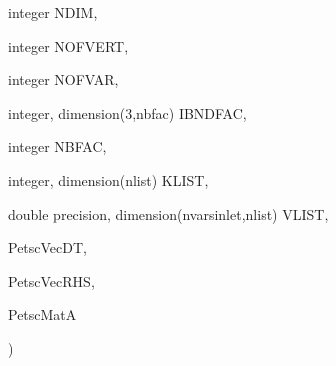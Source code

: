 {{\begin{DoxyParamCaption}
\item[{integer}]{N\-D\-I\-M, }
\item[{integer}]{N\-O\-F\-V\-E\-R\-T, }
\item[{integer}]{N\-O\-F\-V\-A\-R, }
\item[{integer, dimension(3,nbfac)}]{I\-B\-N\-D\-F\-A\-C, }
\item[{integer}]{N\-B\-F\-A\-C, }
\item[{integer, dimension(nlist)}]{K\-L\-I\-S\-T, }
\item[{double precision, dimension(nvarsinlet,nlist)}]{V\-L\-I\-S\-T, }
\item[{}]{Petsc\-Vec\-D\-T, }
\item[{}]{Petsc\-Vec\-R\-H\-S, }
\item[{}]{Petsc\-Mat\-A}
\end{DoxyParamCaption}
)}}\label{seq_2ghost2_8_f_ada232e5267a40e4a7bb3766949b709a7}
